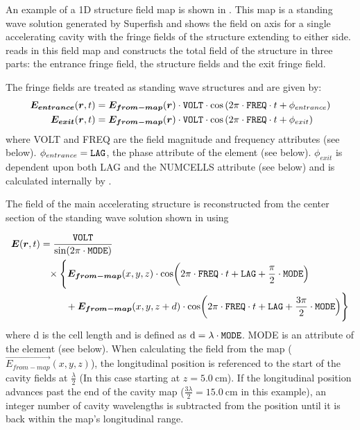 An example of a 1D  structure field map is shown in .
This map is a standing wave solution generated by Superfish and shows the field on axis for a single accelerating cavity with
the fringe fields of the structure extending to either side. \opalt reads in this field map and constructs the total field of the
 structure in three parts: the entrance fringe field, the structure fields and the exit fringe field.

The fringe fields are treated as standing wave structures and are given by:
\begin{equation*}
  \begin{aligned}
    \vec{E_{entrance}}(\vec{r}, t) &= \vec{E_{from-map}}(\vec{r}) \cdot \text{\keyword{VOLT}} \cdot \cos \left( 2\pi \cdot \text{\keyword{FREQ}} \cdot t
        + \phi_{entrance} \right) \\
    \vec{E_{exit}}(\vec{r}, t) &= \vec{E_{from-map}}(\vec{r}) \cdot \text{\keyword{VOLT}} \cdot \cos \left( 2\pi \cdot \text{\keyword{FREQ}} \cdot t
        + \phi_{exit} \right)
  \end{aligned}
\end{equation*}
where VOLT and FREQ are the field magnitude and frequency attributes (see below).
$ \phi_{entrance}= \text{\keyword{LAG}}$, the phase attribute of the element (see below). $ \phi_{exit} $ is dependent upon both LAG and the NUMCELLS
attribute (see below) and is calculated internally by \opalt.

The field of the main accelerating structure is reconstructed from the center section of the standing wave solution shown in
 using

\begin{equation*}
  \begin{split}
    \vec{E} ( \vec{r},t ) &= \frac{\text{\keyword{VOLT}}}{\sin (2 \pi \cdot \text{\keyword{MODE}})} \\
    &\phantom{=}
    \times \Biggl\{ \vec{E_{from-map}} (x,y,z) \cdot \cos \biggl( 2 \pi \cdot \text{\keyword{FREQ}} \cdot t + \text{\keyword{LAG}}+ \frac{\pi}{2} \cdot \text{\keyword{MODE}} \Bigr) \\
    &\phantom{= \times \Biggl\{}
    + \vec{E_{from-map}}(x,y,z+d) \cdot \cos \biggl( 2 \pi \cdot \text{\keyword{FREQ}} \cdot t + \text{\keyword{LAG}} + \frac{3 \pi}{2} \cdot \text{\keyword{MODE}} \Bigr) \Biggr\}
  \end{split}
\end{equation*}
where d is the cell length and is defined as $\text{d} = \lambda \cdot \text{\keyword{MODE}} $. MODE is an attribute of the element (see below).
When calculating the field from the map ($\vec{E_{from-map}}(x,y,z)$), the longitudinal position is referenced to the start of the cavity fields
at $\frac{\lambda}{2}$ (In this case starting at $z = \SI{5.0}{\centi\meter}$). If the longitudinal position advances past the end of the cavity map
($\frac{3\lambda}{2} = \SI{15.0}{\centi\meter}$ in this example), an integer number of cavity wavelengths is subtracted from the position until it is back
within the map's longitudinal range.

